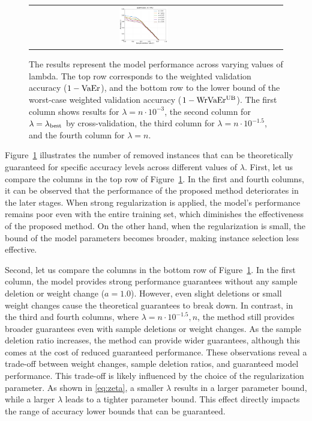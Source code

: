 \begin{figure}[tb]
\begin{center}
\begin{tabular}{cccc}
				\includegraphics[width=0.22\textwidth]{fig/table_logistic/australian-logistic/kernel/kernel_ss_screening_rate_lam552_x_n_y_etest.pdf}
			\end{tabular}
		\end{center}
		\caption{The results represent the model performance across varying values of lambda. The top row corresponds to the
		weighted validation accuracy ($1-{\rm VaEr}$), and the bottom row to the lower bound of the worst-case weighted validation accuracy ($1-{\rm WrVaEr^{\rm UB}}$). The first column shows results for \(\lambda = n \cdot 10^{-3}\), the second column for \(\lambda = \lambda_{\rm best}\) by cross-validation, the third column for \(\lambda = n \cdot 10^{-1.5}\), and the fourth column for \(\lambda = n\).}
		\label{fig:guarantee}
	\end{figure}

	Figure~\ref{fig:guarantee} illustrates the number of removed instances that can be theoretically guaranteed for specific accuracy levels across different values of $\lambda$.  
	First, let us compare the columns in the top row of Figure~\ref{fig:guarantee}.  
	In the first and fourth columns, it can be observed that the performance of the proposed method deteriorates in the later stages.
	When strong regularization is applied, the model's performance remains poor even with the entire training set, which diminishes the effectiveness of the proposed method.
	On the other hand, when the regularization is small, the bound of the model parameters becomes broader, making instance selection less effective.

	Second, let us compare the columns in the bottom row of Figure~\ref{fig:guarantee}.
	In the first column, the model provides strong performance guarantees without any sample deletion or weight change (\(a = 1.0\)).
	However, even slight deletions or small weight changes cause the theoretical guarantees to break down.
	In contrast, in the third and fourth columns, where \(\lambda = n \cdot 10^{-1.5}, n\), the method still provides broader guarantees even with sample deletions or weight changes.
	As the sample deletion ratio increases, the method can provide wider guarantees, although this comes at the cost of reduced guaranteed performance.
	These observations reveal a trade-off between weight changes, sample deletion ratios, and guaranteed model performance.  
	This trade-off is likely influenced by the choice of the regularization parameter.  
	As shown in \eqref{eq:zeta}, a smaller $\lambda$ results in a larger parameter bound, while a larger $\lambda$ leads to a tighter parameter bound.  
	This effect directly impacts the range of accuracy lower bounds that can be guaranteed.